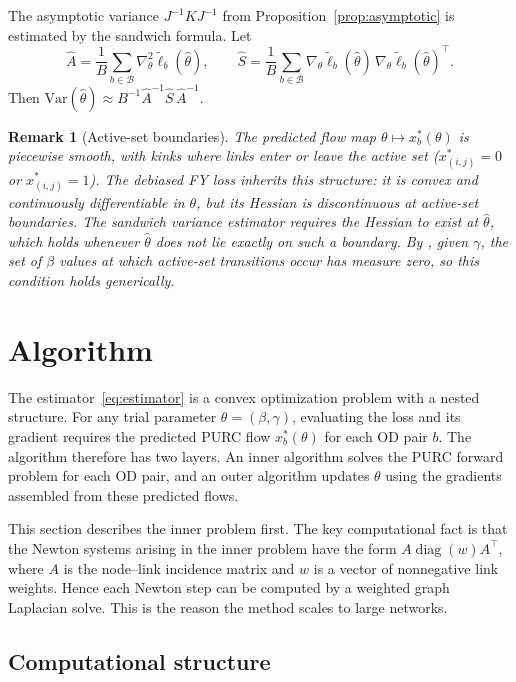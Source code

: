 \documentclass[12pt]{article}
\newcommand{\cB}{\mathcal{B}}
\newtheorem{remark}{Remark}
\begin{document}
The asymptotic variance $J^{-1} K J^{-1}$ from Proposition~\ref{prop:asymptotic} is estimated by the sandwich formula. Let
\[
    \hat{A} = \frac{1}{B} \sum_{b \in \cB}
        \nabla^2_\theta \tilde{\ell}_b(\hat\theta),
    \qquad
    \hat{S} = \frac{1}{B} \sum_{b \in \cB}
        \nabla_\theta \tilde{\ell}_b(\hat\theta)\,
        \nabla_\theta \tilde{\ell}_b(\hat\theta)^\top.
\]
Then $\mathrm{Var}(\hat\theta) \approx B^{-1} \hat{A}^{-1} \hat{S}\, \hat{A}^{-1}$.


\begin{remark}[Active-set boundaries]
The predicted flow map $\theta \mapsto x^*_b(\theta)$ is piecewise smooth, with kinks where links enter or leave the active set ($x^*_{(i,j)} = 0$ or $x^*_{(i,j)} = 1$). The debiased FY loss inherits this structure: it is convex and continuously differentiable in $\theta$, but its Hessian is discontinuous at active-set boundaries. The sandwich variance estimator requires the Hessian to exist at $\hat{\theta}$, which holds whenever $\hat{\theta}$ does not lie exactly on such a boundary. By \citet[Theorem~1]{fosgerau_sensitivity_2025}, given $\gamma$, the set of $\beta$ values at which active-set transitions occur has measure zero, so this condition holds generically. \end{remark}


\section{Algorithm}\label{sec:algorithm}

The estimator~\eqref{eq:estimator} is a convex optimization problem with a
nested structure. For any trial parameter $\theta=(\beta,\gamma)$, evaluating
the loss and its gradient requires the predicted PURC flow
$x^*_b(\theta)$ for each OD pair $b$. The algorithm therefore has two layers. An
inner algorithm solves the PURC forward problem for each OD pair, and an outer
algorithm updates $\theta$ using the gradients assembled from these predicted
flows.

This section describes the inner problem first. The key computational fact is
that the Newton systems arising in the inner problem have the form
$A\operatorname{diag}(w)A^\top$, where $A$ is the node--link incidence matrix and
$w$ is a vector of nonnegative link weights. Hence each Newton step can be
computed by a weighted graph Laplacian solve. This is the reason the method
scales to large networks.

\subsection{Computational structure}\label{sec:algo-structure}
\end{document}
